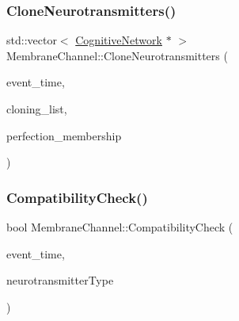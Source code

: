 \mbox{\label{classMembraneChannel_a6426185a0d73c967adcb72e3a22b48b0}} 
\subsubsection{\texorpdfstring{Clone\+Neurotransmitters()}{CloneNeurotransmitters()}}
{\footnotesize\ttfamily std\+::vector$<$ \mbox{\hyperlink{classCognitiveNetwork}{Cognitive\+Network}} $\ast$ $>$ Membrane\+Channel\+::\+Clone\+Neurotransmitters (\begin{DoxyParamCaption}\item[{std\+::chrono\+::time\+\_\+point$<$ \mbox{\hyperlink{universe_8h_a0ef8d951d1ca5ab3cfaf7ab4c7a6fd80}{Clock}} $>$}]{event\+\_\+time,  }\item[{std\+::vector$<$ \mbox{\hyperlink{classCognitiveNetwork}{Cognitive\+Network}} $\ast$$>$}]{cloning\+\_\+list,  }\item[{double}]{perfection\+\_\+membership }\end{DoxyParamCaption})}

\mbox{\label{classMembraneChannel_a67496ca67ad3ecae38f6b987547b1b99}} 
\subsubsection{\texorpdfstring{Compatibility\+Check()}{CompatibilityCheck()}}
{\footnotesize\ttfamily bool Membrane\+Channel\+::\+Compatibility\+Check (\begin{DoxyParamCaption}\item[{std\+::chrono\+::time\+\_\+point$<$ \mbox{\hyperlink{universe_8h_a0ef8d951d1ca5ab3cfaf7ab4c7a6fd80}{Clock}} $>$}]{event\+\_\+time,  }\item[{int}]{neurotransmitter\+Type }\end{DoxyParamCaption})}

\mbox{\label{classMembraneChannel_aa8e78a1b0dd7c6b81cac09d33f01e6c2}} 
